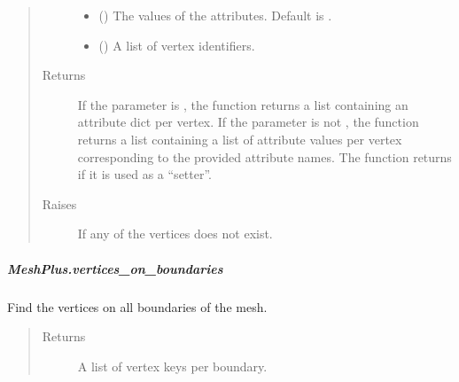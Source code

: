 \documentclass[letterpaper,10pt,english]{sphinxmanual}
\begin{document}
\begin{fulllineitems}
\begin{fulllineitems}
\begin{quote}
\begin{description}
\begin{itemize}
\item {} 
 () \textendash{} The values of the attributes.
Default is .

\item {} 
 () \textendash{} A list of vertex identifiers.

\end{itemize}

\item[{Returns}] \leavevmode
{} \textendash{} If the parameter  is ,
the function returns a list containing an attribute dict per vertex.
If the parameter  is not ,
the function returns a list containing a list of attribute values per vertex corresponding to the provided attribute names.
The function returns  if it is used as a “setter”.

\item[{Raises}] \leavevmode
{} \textendash{} If any of the vertices does not exist.

\end{description}\end{quote}

\end{fulllineitems}



\subparagraph{MeshPlus.vertices\_on\_boundaries}
\label{\detokenize{api/generated/directional_clustering.mesh.MeshPlus.vertices_on_boundaries:meshplus-vertices-on-boundaries}}\label{\detokenize{api/generated/directional_clustering.mesh.MeshPlus.vertices_on_boundaries::doc}}

\begin{fulllineitems}
\label{\detokenize{api/generated/directional_clustering.mesh.MeshPlus.vertices_on_boundaries:directional_clustering.mesh.MeshPlus.vertices_on_boundaries}}
Find the vertices on all boundaries of the mesh.
\begin{quote}\begin{description}
\item[{Returns}] \leavevmode
{} \textendash{} A list of vertex keys per boundary.


\end{description}
\end{quote}
\end{fulllineitems}
\end{fulllineitems}
\end{document}
